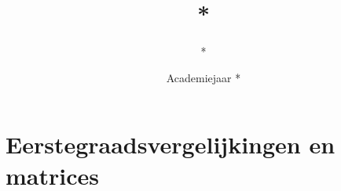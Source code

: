 \documentclass{exam} %
\title{*}
\author{*}
\date{Academiejaar *}
\begin{document}
\begin{titlingpage}
\maketitle
\end{titlingpage}

\newpage


    


\newpage

\tableofcontents

\newpage



\section{Eerstegraadsvergelijkingen en matrices}

\vspace{0.5cm}


\end{document}
